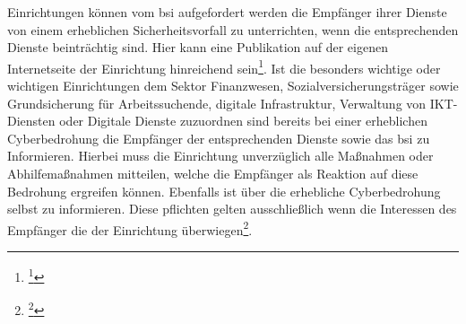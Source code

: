 \documentclass[11pt,a4paper,hidelinks]{article}   %
\begin{document}
Einrichtungen können vom \gls{bsi} aufgefordert werden die Empfänger ihrer Dienste von einem erheblichen Sicherheitsvorfall zu unterrichten, wenn die entsprechenden Dienste beinträchtig sind. Hier kann eine Publikation auf der eigenen Internetseite der Einrichtung hinreichend sein\footnote{\footcite[Vgl. §35, Absatz 1,][]{NIS2UmsuCG}}. Ist die besonders wichtige oder wichtigen Einrichtungen dem Sektor Finanzwesen, Sozialversicherungsträger sowie Grundsicherung für Arbeitssuchende, digitale Infrastruktur, Verwaltung von IKT-Diensten oder Digitale Dienste zuzuordnen sind bereits bei einer erheblichen Cyberbedrohung die Empfänger der entsprechenden Dienste sowie das \gls{bsi} zu Informieren. Hierbei muss die Einrichtung unverzüglich alle Maßnahmen oder Abhilfemaßnahmen mitteilen, welche die Empfänger als Reaktion auf diese Bedrohung ergreifen können. Ebenfalls ist über die erhebliche Cyberbedrohung selbst zu informieren. Diese pflichten gelten ausschließlich wenn die Interessen des Empfänger die der Einrichtung überwiegen\footnote{\footcite[Vgl. §35, Absatz 2,][]{NIS2UmsuCG}}.
\end{document}
